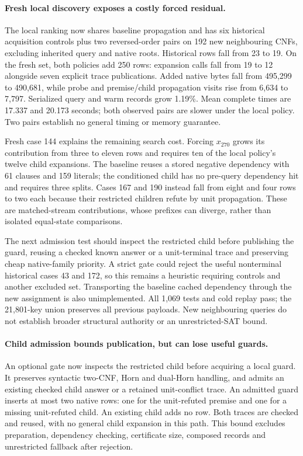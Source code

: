 \documentclass[11pt,a4paper]{article}
\numberwithin{equation}{section}
\theoremstyle{plain}
\theoremstyle{definition}
\theoremstyle{remark}
\begin{document}
\paragraph{Fresh local discovery exposes a costly forced residual.}
The local ranking now shares baseline propagation and has six historical
acquisition controls plus two reversed-order pairs on 192 new neighbouring
CNFs, excluding inherited query and native roots. Historical rows fall from
23 to 19. On the fresh set, both policies add 250 rows: expansion calls fall
from 19 to 12 alongside seven explicit trace publications. Added native bytes
fall from 495,299 to 490,681, while probe and premise/child propagation visits
rise from 6,634 to 7,797. Serialized query and warm records grow 1.19\%.
Mean complete times are 17.337 and 20.173 seconds; both observed pairs are slower
under the local policy. Two pairs establish no general timing or memory guarantee.

Fresh case 144 explains the remaining search cost. Forcing $x_{270}$ grows
its contribution from three to eleven rows and requires ten of the local
policy's twelve child expansions. The baseline reuses a stored negative
dependency with 61 clauses and 159 literals; the conditioned child has no
pre-query dependency hit and requires three splits. Cases 167 and 190 instead
fall from eight and four rows to two each because their restricted children
refute by unit propagation. These are matched-stream contributions, whose
prefixes can diverge, rather than isolated equal-state comparisons.

The next admission test should inspect the restricted child before publishing
the guard, reusing a checked known answer or a unit-terminal trace and preserving
cheap native-family priority. A strict gate could reject the useful nonterminal
historical cases 43 and 172, so this remains a heuristic requiring controls and
another excluded set. Transporting the baseline cached dependency through the
new assignment is also unimplemented. All 1,069 tests and cold replay pass;
the 21,801-key union preserves all previous payloads. New neighbouring queries
do not establish broader structural authority or an unrestricted-SAT bound.

\paragraph{Child admission bounds publication, but can lose useful guards.}
An optional gate now inspects the restricted child before acquiring a local
guard. It preserves syntactic two-CNF, Horn and dual-Horn handling, and admits
an existing checked child answer or a retained unit-conflict trace. An admitted
guard inserts at most two native rows: one for the unit-refuted premise and
one for a missing unit-refuted child. An existing child adds no row. Both
traces are checked and reused, with no general child expansion in this path.
This bound excludes preparation, dependency checking, certificate size,
composed records and unrestricted fallback after rejection.
\end{document}
